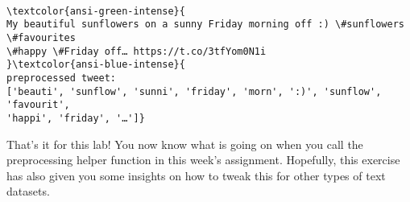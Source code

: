 \documentclass[11pt]{article}
\begin{document}
    \begin{Verbatim}[commandchars=\\\{\}]

\textcolor{ansi-green-intense}{
My beautiful sunflowers on a sunny Friday morning off :) \#sunflowers \#favourites
\#happy \#Friday off… https://t.co/3tfYom0N1i
}\textcolor{ansi-blue-intense}{
preprocessed tweet:
['beauti', 'sunflow', 'sunni', 'friday', 'morn', ':)', 'sunflow', 'favourit',
'happi', 'friday', '…']}
    \end{Verbatim}

    That's it for this lab! You now know what is going on when you call the
preprocessing helper function in this week's assignment. Hopefully, this
exercise has also given you some insights on how to tweak this for other
types of text datasets.


    
    
    
\end{document}
